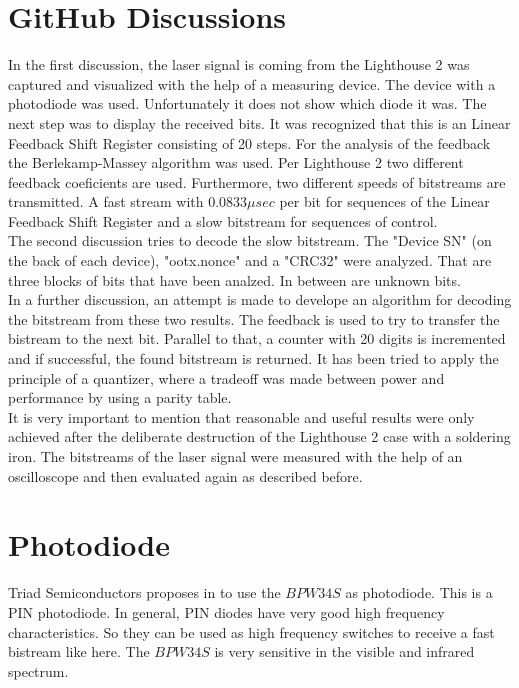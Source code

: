 \documentclass[a4paper,twoside, openright,12pt]{report}
\begin{document}
\section{GitHub Discussions}
\label{Section_GitHub-Discussion}
In the first discussion, the laser signal is coming from the Lighthouse 2 was captured and visualized with the help of a measuring device. The device \cite{CypressSemiconductorCorporation.20190428} with a photodiode was used. Unfortunately it does not show which diode it was. The next step was to display the received bits. It was recognized that this is an Linear Feedback Shift Register consisting of 20 steps. For the analysis of the feedback the Berlekamp-Massey algorithm was used. Per Lighthouse 2 two different feedback coeficients are used. Furthermore, two different speeds of bitstreams are transmitted. A fast stream with $0.0833\mu sec$ per bit for sequences of the Linear Feedback Shift Register and a slow bitstream for sequences of control. \cite{.} \\
The second discussion tries to decode the slow bitstream. The "Device SN" (on the back of each device), "ootx.nonce" and a "CRC32" were analyzed. That are three blocks of bits that have been analzed. In between are unknown bits. \cite{.b} \\
In a further discussion, an attempt is made to develope an algorithm for decoding the bitstream from these two results. The feedback is used to try to transfer the bistream to the next bit. Parallel to that, a counter with 20 digits is incremented and if successful, the found bitstream is returned. \cite{.c} It has been tried to apply the principle of a quantizer, where a tradeoff was made between power and performance by using a parity table. \cite{Hagenauer.20170420} \\
It is very important to mention that reasonable and useful results were only achieved after the deliberate destruction of the Lighthouse 2 case with a soldering iron. The bitstreams of the laser signal were measured with the help of an oscilloscope and then evaluated again as described before. \cite{.e}


\section{Photodiode}
\label{Section_Photodiode}
Triad Semiconductors proposes in \cite{TriadSemiconductor.2016} to use the $BPW34S$ as photodiode. This is a PIN photodiode. In general, PIN diodes have very good high frequency characteristics. So they can be used as high frequency switches to receive a fast bistream like here. The $BPW34S$ is very sensitive in the visible and infrared spectrum. \cite{VishayIntertechnology.2017} \cite{Tietze.2016} \\
\end{document}
